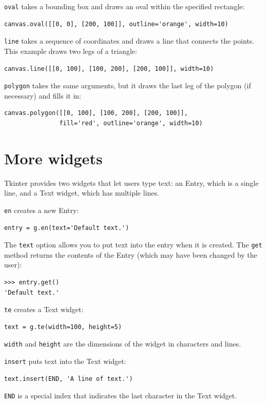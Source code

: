 \documentclass[10pt]{book}
\begin{document}
{\tt oval} takes a bounding box and draws an oval
within the specified rectangle:

\begin{verbatim}
canvas.oval([[0, 0], [200, 100]], outline='orange', width=10)
\end{verbatim}
%
{\tt line} takes a sequence of coordinates and draws
a line that connects the points.  This example draws two legs
of a triangle:

\begin{verbatim}
canvas.line([[0, 100], [100, 200], [200, 100]], width=10)
\end{verbatim}
%
{\tt polygon} takes the same arguments, but it draws the last
leg of the polygon (if necessary) and fills it in:

\begin{verbatim}
canvas.polygon([[0, 100], [100, 200], [200, 100]],
               fill='red', outline='orange', width=10)
\end{verbatim}
%


\section{More widgets}

Tkinter provides two widgets that let users type text: an
Entry, which is a single line, and a Text widget, which has
multiple lines.

{\tt en} creates a new Entry:

\begin{verbatim}
entry = g.en(text='Default text.')
\end{verbatim}
%
The {\tt text} option allows you to put text into the entry
when it is created.  The {\tt get} method returns the contents
of the Entry (which may have been changed by the user):

\begin{verbatim}
>>> entry.get()
'Default text.'
\end{verbatim}
%
{\tt te} creates a Text widget:

\begin{verbatim}
text = g.te(width=100, height=5)
\end{verbatim}
%
{\tt width} and {\tt height} are the dimensions of the
widget in characters and lines.

{\tt insert} puts text into the Text widget:

\begin{verbatim}
text.insert(END, 'A line of text.')
\end{verbatim}
%
{\tt END} is a special index that indicates the last character in the
Text widget.
\end{document}
